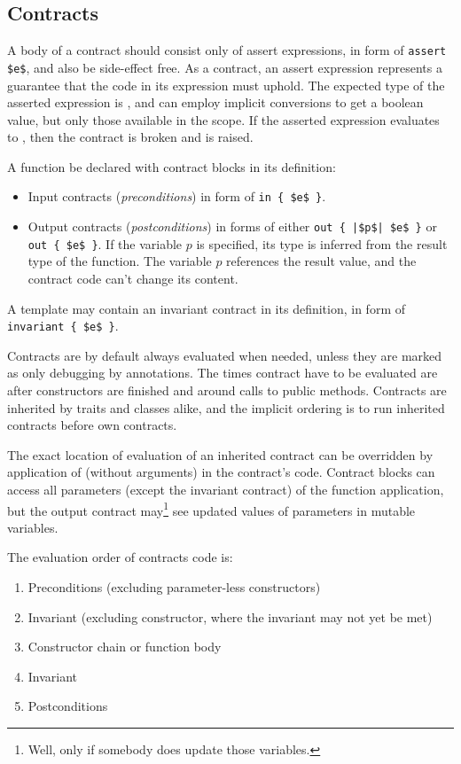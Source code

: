 \subsection{Contracts}

A body of a contract should consist only of assert expressions, in form of \lstinline!assert $e$!, and also be side-effect free. As a contract, an assert expression represents a guarantee that the code in its expression must uphold. The expected type of the asserted expression is , and can employ implicit conversions to get a boolean value, but only those available in the scope. If the asserted expression evaluates to , then the contract is broken and  is raised. 

A function be declared with contract blocks in its definition:
\begin{itemize}
  \item Input contracts ({\em preconditions}) in form of \lstinline!in { $e$ }!.
  \item Output contracts ({\em postconditions}) in forms of either \lstinline!out { |$p$| $e$ }! or \lstinline!out { $e$ }!. If the variable $p$ is specified, its type is inferred from the result type of the function. The variable $p$ references the result value, and the contract code can't change its content. 
\end{itemize}

A template may contain an invariant contract in its definition, in form of \lstinline!invariant { $e$ }!.

Contracts are by default always evaluated when needed, unless they are marked as only debugging by annotations. The times contract have to be evaluated are after constructors are finished and around calls to public methods. Contracts are inherited by traits and classes alike, and the implicit ordering is to run inherited contracts before own contracts. 

The exact location of evaluation of an inherited contract can be overridden by application of  (without arguments) in the contract's code. Contract blocks can access all parameters (except the invariant contract) of the function application, but the output contract may\footnote{Well, only if somebody does update those variables.} see updated values of parameters in mutable variables. 

The evaluation order of contracts code is:
\begin{enumerate}
  \item Preconditions (excluding parameter-less constructors)
  \item Invariant (excluding constructor, where the invariant may not yet be met)
  \item Constructor chain or function body
  \item Invariant
  \item Postconditions
\end{enumerate}

